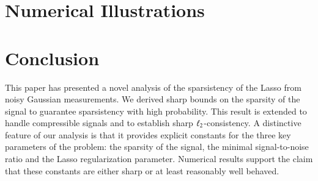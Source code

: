 \documentclass[preprint,11pt]{elsarticle}
\begin{document}
\section{Numerical Illustrations}
\label{sec-numerics}




\section{Conclusion}
\label{sec-conclusion}

This paper has presented a novel analysis of the sparsistency of the Lasso from noisy Gaussian measurements. We derived sharp bounds on the sparsity of the signal to guarantee sparsistency with high probability. This result is extended to handle compressible signals and to establish sharp $\ell_2$-consistency. A distinctive feature of our analysis is that it provides explicit constants for the three key parameters of the problem: the sparsity of the signal, the minimal signal-to-noise ratio and the Lasso regularization parameter. Numerical results support the claim that these constants are either sharp or at least reasonably well behaved. 






\appendix





\end{document}
